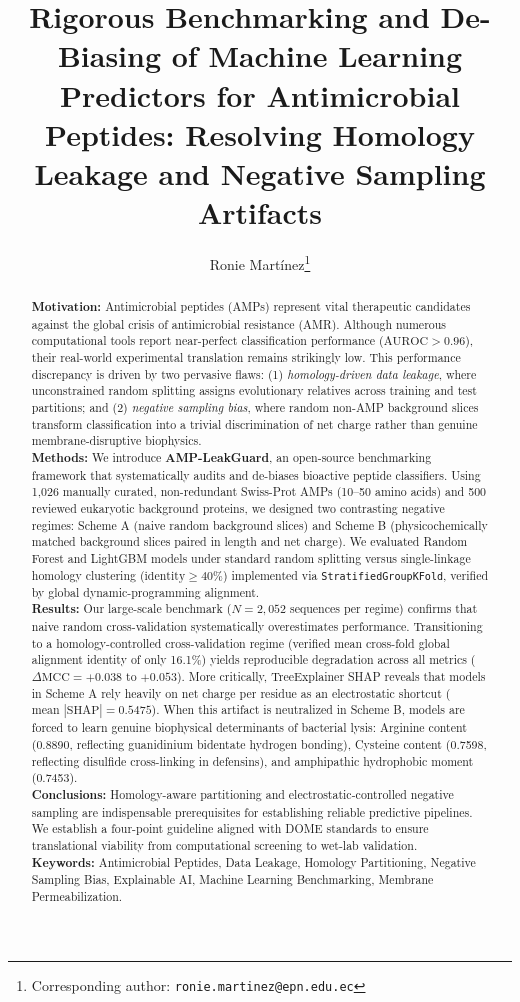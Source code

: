 \documentclass[11pt,a4paper]{article}
\title{\textbf{Rigorous Benchmarking and De-Biasing of Machine Learning Predictors for Antimicrobial Peptides: Resolving Homology Leakage and Negative Sampling Artifacts}}
\author[1]{Ronie Martínez\thanks{Corresponding author: \texttt{ronie.martinez@epn.edu.ec}}}
\affil[1]{Departamento de Inform{\'a}tica y Ciencias de la Computaci{\'o}n, Escuela Polit{\'e}cnica Nacional, Quito, Ecuador}
\date{}
\begin{document}
\maketitle

\begin{abstract}
\textbf{Motivation:} Antimicrobial peptides (AMPs) represent vital therapeutic candidates against the global crisis of antimicrobial resistance (AMR). Although numerous computational tools report near-perfect classification performance ($\text{AUROC} > 0.96$), their real-world experimental translation remains strikingly low. This performance discrepancy is driven by two pervasive flaws: (1) \textit{homology-driven data leakage}, where unconstrained random splitting assigns evolutionary relatives across training and test partitions; and (2) \textit{negative sampling bias}, where random non-AMP background slices transform classification into a trivial discrimination of net charge rather than genuine membrane-disruptive biophysics.\\
\textbf{Methods:} We introduce \textbf{AMP-LeakGuard}, an open-source benchmarking framework that systematically audits and de-biases bioactive peptide classifiers. Using 1,026 manually curated, non-redundant Swiss-Prot AMPs (10--50 amino acids) and 500 reviewed eukaryotic background proteins, we designed two contrasting negative regimes: Scheme A (naive random background slices) and Scheme B (physicochemically matched background slices paired in length and net charge). We evaluated Random Forest and LightGBM models under standard random splitting versus single-linkage homology clustering ($\text{identity} \ge 40\%$) implemented via \texttt{StratifiedGroupKFold}, verified by global dynamic-programming alignment.\\
\textbf{Results:} Our large-scale benchmark ($N = 2,052$ sequences per regime) confirms that naive random cross-validation systematically overestimates performance. Transitioning to a homology-controlled cross-validation regime (verified mean cross-fold global alignment identity of only 16.1\%) yields reproducible degradation across all metrics ($\Delta\text{MCC} = +0.038$ to $+0.053$). More critically, TreeExplainer SHAP reveals that models in Scheme A rely heavily on net charge per residue as an electrostatic shortcut ($\text{mean } |\text{SHAP}| = 0.5475$). When this artifact is neutralized in Scheme B, models are forced to learn genuine biophysical determinants of bacterial lysis: Arginine content (0.8890, reflecting guanidinium bidentate hydrogen bonding), Cysteine content (0.7598, reflecting disulfide cross-linking in defensins), and amphipathic hydrophobic moment (0.7453).\\
\textbf{Conclusions:} Homology-aware partitioning and electrostatic-controlled negative sampling are indispensable prerequisites for establishing reliable predictive pipelines. We establish a four-point guideline aligned with DOME standards to ensure translational viability from computational screening to wet-lab validation.\\
\textbf{Keywords:} Antimicrobial Peptides, Data Leakage, Homology Partitioning, Negative Sampling Bias, Explainable AI, Machine Learning Benchmarking, Membrane Permeabilization.
\end{abstract}
\end{document}
